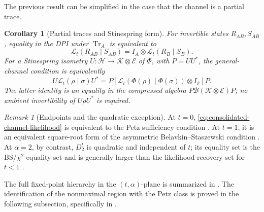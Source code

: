 \documentclass[11pt]{article}
\newtheorem{corollary}[corollary]{Corollary}
\theoremstyle{remark}
\newtheorem{remark}[remark]{Remark}
\newcommand{\1}{\mathbbm{1}}
\begin{document}
The previous result can be simplified in the case that the channel is a partial trace.

\begin{corollary}[Partial traces and Stinespring form]
\label{cor:consolidated-partial-trace}
For invertible states $R_{AB},S_{AB}$, equality in the DPI under
$\operatorname{Tr}_A$ is equivalent to
\begin{equation}
 \mathcal L_t(R_{AB}\mid S_{AB})
 =I_A\otimes\mathcal L_t(R_B\mid S_B).
 \label{eq:consolidated-partial-trace-likelihood}
\end{equation}
For a Stinespring isometry
$U:\mathcal H\to\mathcal K\otimes\mathcal E$ of $\Phi$, with
$P=UU^*$, the general-channel condition is equivalently
\begin{equation}
 U\mathcal L_t(\rho\mid\sigma)U^*
 =P\left[
 \mathcal L_t(\Phi(\rho)\mid\Phi(\sigma))\otimes I_{\mathcal E}
 \right]P.
 \label{eq:consolidated-Stinespring-likelihood}
\end{equation}
The latter identity is an equality in the compressed algebra
$P\mathcal B(\mathcal K\otimes\mathcal E)P$; no ambient
invertibility of $U\rho U^*$ is required.
\end{corollary}

\begin{remark}[Endpoints and the quadratic exception]
At $t=0$, \eqref{eq:consolidated-channel-likelihood} is equivalent
to the Petz sufficiency condition
\cite[Theorem~3.18]{hiai2017different}.  At $t=1$, it is an equivalent
square-root form of the asymmetric Belavkin--Staszewski condition
\cite[Theorem~4.2 and Eq.~(14)]{bluhm2020strengthened}.
At $\alpha=2$, by contrast, $D_2^t$ is quadratic and independent
of $t$; its equality set is the BS/$\chi^2$ equality set and is
generally larger than the likelihood-recovery set for $t<1$
\cite[Example~4.2 and Theorem~3.34]{hiai2017different}.
\end{remark}

The full fixed-point hierarchy in the $(t,\alpha)$-plane is
summarized in .  The
identification of the nonmaximal region with the Petz class is proved
in the following subsection, specifically in
.
\end{document}
